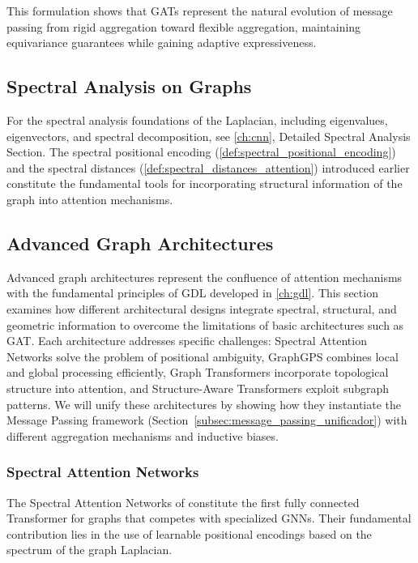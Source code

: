 This formulation shows that GATs represent the natural evolution of message passing from rigid aggregation toward flexible aggregation, maintaining equivariance guarantees while gaining adaptive expressiveness.

\subsection{Spectral Analysis on Graphs}

For the spectral analysis foundations of the Laplacian, including eigenvalues, eigenvectors, and spectral decomposition, see \autoref{ch:cnn}, Detailed Spectral Analysis Section. The spectral positional encoding (\autoref{def:spectral_positional_encoding}) and the spectral distances (\autoref{def:spectral_distances_attention}) introduced earlier constitute the fundamental tools for incorporating structural information of the graph into attention mechanisms.

\subsection{Advanced Graph Architectures}\label{subsec:arquitecturas_avanzadas_grafos}

Advanced graph architectures represent the confluence of attention mechanisms with the fundamental principles of \gls{GDL} developed in \autoref{ch:gdl}. This section examines how different architectural designs integrate spectral, structural, and geometric information to overcome the limitations of basic architectures such as GAT. Each architecture addresses specific challenges: Spectral Attention Networks solve the problem of positional ambiguity, GraphGPS combines local and global processing efficiently, Graph \glspl{Transformer} incorporate topological structure into attention, and Structure-Aware \glspl{Transformer} exploit subgraph patterns. We will unify these architectures by showing how they instantiate the Message Passing framework (Section~\ref{subsec:message_passing_unificador}) with different aggregation mechanisms and inductive biases.

\subsubsection{Spectral Attention Networks}\label{subsubsec:san_advanced}

The Spectral Attention Networks of \citet{kreuzer2021spectral} constitute the first fully connected \gls{Transformer} for graphs that competes with specialized \glspl{GNN}. Their fundamental contribution lies in the use of learnable positional encodings based on the spectrum of the graph Laplacian.

